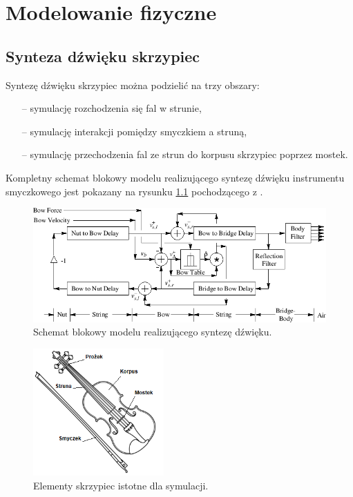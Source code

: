 \chapter{Modelowanie fizyczne}
\section{Synteza dźwięku skrzypiec}

Syntezę dźwięku skrzypiec można podzielić na trzy obszary:
\begin{itemize}
	\setlength\itemsep{-3pt}
	\item[--] symulację rozchodzenia się fal w strunie,
	\item[--] symulację interakcji pomiędzy smyczkiem a struną,
	\item[--] symulację przechodzenia fal ze strun do korpusu skrzypiec poprzez mostek.
\end{itemize}
Kompletny schemat blokowy modelu realizującego syntezę dźwięku instrumentu smyczkowego jest pokazany na rysunku \ref{rys:schematblokowy} pochodzącego z \cite{bowed_3}.
\begin{figure}[H]
	\centering
	\includegraphics[width=12cm]{grafiki/schematblokowy}
	\captionsetup{justification=centering}
	\caption{Schemat blokowy modelu realizującego syntezę dźwięku.}
	\label{rys:schematblokowy}
\end{figure}

\begin{figure}[H]
	\centering
	\includegraphics[width=5cm]{grafiki/skrzypce}
	\captionsetup{justification=centering}
	\caption{Elementy skrzypiec istotne dla symulacji.}
	\label{rys:skrzypce}
\end{figure}

